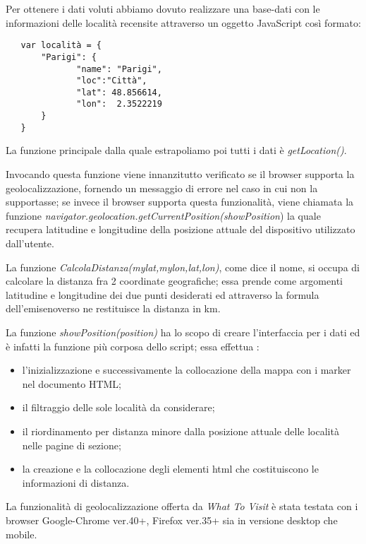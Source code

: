 \begin{flushleft}
Per ottenere i dati voluti abbiamo dovuto realizzare una base-dati con le informazioni delle località recensite attraverso un oggetto JavaScript così formato:
\end{flushleft}
\begin{verbatim}
   var località = {
       "Parigi": {
	          "name": "Parigi",
	          "loc":"Città",
	          "lat": 48.856614,
	          "lon":  2.3522219
       }
   }
\end{verbatim}
\begin{flushleft}
La funzione principale dalla quale estrapoliamo poi tutti i dati è \textit{getLocation()}.

Invocando questa funzione viene innanzitutto verificato se il browser supporta la geolocalizzazione, fornendo un messaggio di errore nel caso in cui non la supportasse; se invece il browser supporta questa funzionalità, viene chiamata la funzione \textit{navigator.geolocation.getCurrentPosition(showPosition}) la quale recupera latitudine e longitudine della posizione attuale del dispositivo utilizzato dall'utente.
\end{flushleft}
\begin{flushleft}
La funzione \textit{CalcolaDistanza(mylat,mylon,lat,lon)}, come dice il nome, si occupa di calcolare la distanza fra 2 coordinate geografiche; essa prende come argomenti latitudine e longitudine dei due punti desiderati ed attraverso la formula dell'emisenoverso ne restituisce la distanza in km.
\end{flushleft}

\begin{flushleft}
La funzione \textit{showPosition(position)} ha lo scopo di creare l'interfaccia per i dati ed è infatti la funzione più corposa dello script; essa effettua :
\end{flushleft}
\begin{itemize}
\item l'inizializzazione e successivamente la collocazione  della mappa con i marker nel documento HTML;
\item il filtraggio delle sole località da considerare;
\item il riordinamento per distanza minore dalla posizione attuale delle località nelle pagine di sezione;
\item la creazione e la collocazione degli elementi html che costituiscono le informazioni di distanza.
\end{itemize}

\begin{flushleft}
La funzionalità di geolocalizzazione offerta da \textit{What To Visit} è stata testata con i browser Google-Chrome ver.40+, Firefox ver.35+ sia in versione desktop che mobile.
\end{flushleft}



















